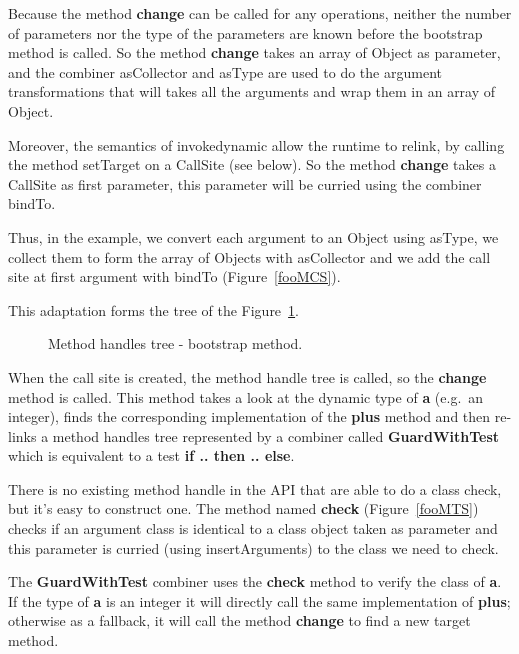 \documentclass{sig-alternate}
\begin{document}
      Because the method {\bf change} can be called for any operations, neither the number of parameters nor the type
      of the parameters are known before the bootstrap method is called. So the method {\bf change} takes an array of
      Object as parameter, and the combiner asCollector and asType are used to do the argument transformations
      that will takes all the arguments and wrap them in an array of Object.

      Moreover, the semantics of invokedynamic allow the runtime to relink, by calling the method setTarget
      on a CallSite (see below). So the method {\bf change} takes a CallSite as first parameter, this parameter
      will be curried using the combiner bindTo.
       
      Thus, in the example, we convert each argument to an Object using asType,
      we collect them to form the array of Objects with asCollector and
      we add the call site at first argument with bindTo (Figure~\ref{fooMCS}).

      \noindent This adaptation forms the tree of the Figure~\ref{ast1}.

      \begin{figure}[!ht]
        \centering \resizebox{.7\linewidth}{!}{}
        \caption{Method handles tree - bootstrap method.}\vspace{-1em}
        \label{ast1}
      \end{figure}

      When the call site is created, the method handle tree is called, so the {\bf change} method is called.
      This method takes a look at the dynamic type of {\bf a} (e.g.~an integer),
      finds the corresponding implementation of the {\bf plus} method
      and then re-links a method handles tree represented by a combiner called {\bf GuardWithTest}
      which is equivalent to a test {\bf if .. then .. else}.

      There is no existing method handle in the API that are able to do a class check,
      but it's easy to construct one. The method named {\bf check} (Figure~\ref{fooMTS}) checks if an argument class
      is identical to a class object taken as parameter and this parameter is curried
      (using insertArguments) to the class we need to check.

      The {\bf GuardWithTest} combiner uses the {\bf check} method to verify the class of {\bf a}.
      If the type of {\bf a} is an integer it will directly call the same implementation of {\bf plus};
      otherwise as a fallback, it will call the method {\bf change} to find a new target method.
\end{document}
